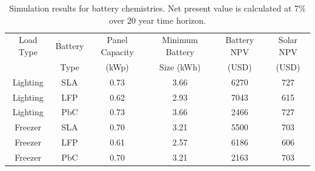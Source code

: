 \documentclass[conference]{IEEEtran}
\begin{document}
\begin{table}[!t]
\centering
\begin{tabular}{ c c c c c c }
Load Type & Battery & Panel Capacity & Minimum Battery & Battery NPV & Solar NPV \\
          & Type    & (kWp)          & Size (kWh)      & (USD)       & (USD)     \\
\hline
%
%

Lighting & SLA     & 0.73 & 3.66 & 6270 & 727 \\
Lighting & LFP           & 0.62 & 2.93 & 7043 & 615 \\
Lighting & PbC   & 0.73 & 3.66 & 2466 & 727 \\

Freezer & SLA      & 0.70 & 3.21 & 5500 & 703 \\
Freezer & LFP            & 0.61 & 2.57 & 6186 & 606 \\
Freezer & PbC    & 0.70 & 3.21 & 2163 & 703 \\

\end{tabular}
\caption{Simulation results for battery chemistries.
Net present value is calculated at 7\% over 20 year
time horizon.}
\label{table_battery}
\end{table}
\end{document}
